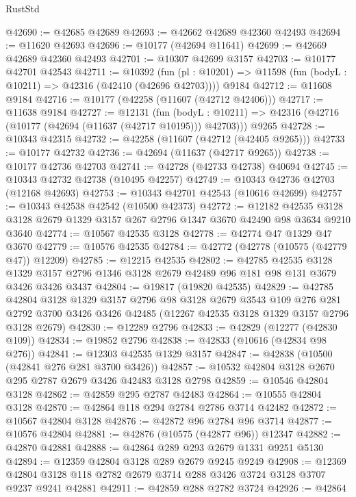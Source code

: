 \begin{lexlean}{RustStd}
\begin{coremodule}
@42690 := @42685 @42689
@42693 := @42662 @42689 @42360 @42493
@42694 := @11620 @42693
@42696 := @10177 (@42694 @11641)
@42699 := @42669 @42689 @42360 @42493
@42701 := @10307 @42699 @3157
@42703 := @10177 @42701 @42543
@42711 := @10392
    (fun (pl : @10201) => @11598 (fun (bodyL : @10211) => @42316 (@42410 (@42696 @42703))))
    @9184
@42712 := @11608 @9184
@42716 := @10177 (@42258 (@11607 (@42712 @42406)))
@42717 := @11638 @9184
@42727 := @12131
    (fun (bodyL : @10211) => @42316 (@42716 (@10177 (@42694 (@11637 (@42717 @10195))) @42703)))
    @9265
@42728 := @10343 @42315
@42732 := @42258 (@11607 (@42712 (@42405 @9265)))
@42733 := @10177 @42732
@42736 := @42694 (@11637 (@42717 @9265))
@42738 := @10177 @42736 @42703
@42741 := @42728 (@42733 @42738) @40694
@42745 := @10343 @42732 @42738 (@10495 @42257)
@42749 := @10343 @42736 @42703 (@12168 @42693)
@42753 := @10343 @42701 @42543 (@10616 @42699)
@42757 := @10343 @42538 @42542 (@10500 @42373)
@42772 := @12182
    @42535
    @3128
    @3128
    @2679
    @1329
    @3157
    @267
    @2796
    @1347
    @3670
    @42490
    @98
    @3634
    @9210
    @3640
@42774 := @10567 @42535 @3128
@42778 := @42774 @47 @1329 @47 @3670
@42779 := @10576 @42535
@42784 := @42772 (@42778 (@10575 (@42779 @47)) @12209)
@42785 := @12215 @42535
@42802 := @42785
    @42535
    @3128
    @1329
    @3157
    @2796
    @1346
    @3128
    @2679
    @42489
    @96
    @181
    @98
    @131
    @3679
    @3426
    @3426
    @3437
@42804 := @19817 (@19820 @42535)
@42829 := @42785
    @42804
    @3128
    @1329
    @3157
    @2796
    @98
    @3128
    @2679
    @3543
    @109
    @276
    @281
    @2792
    @3700
    @3426
    @3426
    @42485
    (@12267 @42535 @3128 @1329 @3157 @2796 @3128 @2679)
@42830 := @12289 @2796
@42833 := @42829 (@12277 (@42830 @109))
@42834 := @19852 @2796
@42838 := @42833 (@10616 (@42834 @98 @276))
@42841 := @12303 @42535 @1329 @3157
@42847 := @42838 (@10500 (@42841 @276 @281 @3700 @3426))
@42857 := @10532 @42804 @3128 @2670 @295 @2787 @2679 @3426 @42483 @3128 @2798
@42859 := @10546 @42804 @3128
@42862 := @42859 @295 @2787 @42483
@42864 := @10555 @42804 @3128
@42870 := @42864 @118 @294 @2784 @2786 @3714 @42482
@42872 := @10567 @42804 @3128
@42876 := @42872 @96 @2784 @96 @3714
@42877 := @10576 @42804
@42881 := @42876 (@10575 (@42877 @96)) @12347
@42882 := @42870 @42881
@42888 := @42864 @289 @293 @2679 @1331 @9251 @5130
@42894 := @12359 @42804 @3128 @289 @2679 @9245 @9249
@42908 := @12369 @42804 @3128 @118 @2782 @2679 @3714 @288 @3426 @3724 @3128 @3707 @9237 @9241 @42881
@42911 := @42859 @288 @2782 @3724
@42926 := @42864

\end{coremodule}
\end{lexlean}
